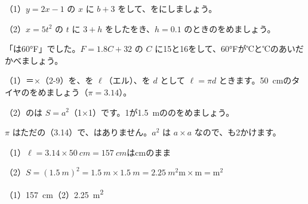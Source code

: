 \begingroup{}%
\noindent\begin{minipage}[t]{0.49\linewidth}
\begin{jibun}
（1）$y=2x-1$ の $x$ に $b+3$ をして、をにしましょう。\par
（2）$x=5t^2$ の $t$ に $3+h$ をしたをき、$h=0.1$ のときのをめましょう。
\end{jibun}
\end{minipage}\hfill
\begin{minipage}[t]{0.49\linewidth}
\begin{jibun}
「は60°F」でした。$F=1.8C+32$ の $C$ に15と16をして、60°Fが℃と℃のあいだかべましょう。
\end{jibun}
\end{minipage}\par
\endgroup

\begin{reidai}
（1）＝×（2-9）を、を $\ell$（エル）、を $d$ として $\ell=\pi d$ ときます。\qty{50}{cm}のタイヤのをめましょう（$\pi=3.14$）。\par
（2）のは $S=a^2$（1×1）です。1が\qty{1.5}{m}ののをめましょう。\par
\kangaekata $\pi$ はただの（3.14）で、はありません。$a^2$ は $a\times a$ なので、も2かけます。\par
\shiki（1）$\ell=3.14\times\qty{50}{cm}=\qty{157}{cm}$\quad {}はcmのまま\par
\hspace*{2.6\zw}（2）$S=(\qty{1.5}{m})^2=\qty{1.5}{m}\times\qty{1.5}{m}=\qty{2.25}{m^2}$\quad $\mathrm{m}\times\mathrm{m}=\mathrm{m^2}$\par
\kotae（1）\nobreak\qty{157}{cm}\quad（2）\nobreak\qty{2.25}{m^2}
\end{reidai}

